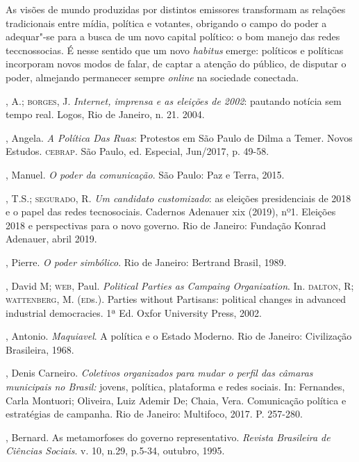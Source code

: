 As visões de mundo produzidas por distintos emissores transformam as
relações tradicionais entre mídia, política e votantes, obrigando o
campo do poder a adequar"-se para a busca de um novo capital político: o
bom manejo das redes teccnossocias. É nesse sentido que um novo
\emph{habitus} emerge: políticos e políticas incorporam novos modos de
falar, de captar a atenção do público, de disputar o poder, almejando
permanecer sempre \emph{\emph{\emph{online}}} na sociedade conectada.


\begin{bibliohedra}
, A.; \textsc{borges}, J. \emph{Internet, imprensa e as eleições de 2002}:
pautando notícia sem tempo real. Logos, Rio de Janeiro, n. 21. 2004.

, Angela. \emph{A Política Das Ruas}: Protestos em São Paulo de
Dilma a Temer. Novos Estudos. \textsc{cebrap}. São Paulo, ed. Especial, Jun/2017,
p. 49-58.

, Manuel. \emph{O poder da comunicação}. São Paulo: Paz e
Terra, 2015.

, T.S.; \textsc{segurado}, R. \emph{Um candidato customizado}: as
eleições presidenciais de 2018 e o papel das redes tecnosociais.
Cadernos Adenauer xix (2019), nº1. Eleições 2018 e perspectivas para o
novo governo. Rio de Janeiro: Fundação Konrad Adenauer, abril 2019.

, Pierre. \emph{O poder simbólico}. Rio de Janeiro: Bertrand
Brasil, 1989.

, David M; \textsc{web}, Paul. \emph{Political Parties as Campaing
Organization}. In. \textsc{dalton}, R; \textsc{wattenberg}, M. (\textsc{ed}s.). Parties without
Partisans: political changes in advanced industrial democracies. 1ª Ed.
Oxfor University Press, 2002.

, Antonio. \emph{Maquiavel}. A política e o Estado Moderno. Rio
de Janeiro: Civilização Brasileira, 1968.

, Denis Carneiro. \emph{Coletivos organizados para mudar o perfil
das câmaras municipais no Brasil:} jovens, política, plataforma e redes
sociais. In: Fernandes, Carla Montuori; Oliveira, Luiz Ademir De; Chaia,
Vera. Comunicação política e estratégias de campanha. Rio de Janeiro:
Multifoco, 2017. P. 257-280.

, Bernard. As metamorfoses do governo representativo.
\emph{Revista Brasileira de Ciências Sociais}. v. 10, n.29, p.5-34,
outubro, 1995.


\end{bibliohedra}
